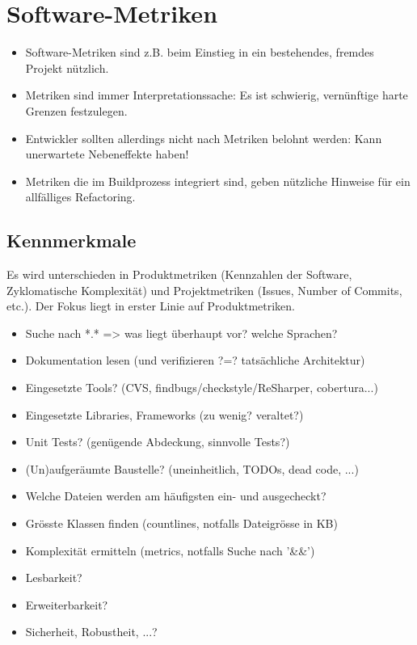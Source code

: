 \section{Software-Metriken}

\begin{itemize}
	\item Software-Metriken sind z.B. beim Einstieg in ein bestehendes, fremdes Projekt nützlich.
	\item Metriken sind immer Interpretationssache: Es ist schwierig, vernünftige harte Grenzen festzulegen.
	\item Entwickler sollten allerdings nicht nach Metriken belohnt werden: Kann unerwartete Nebeneffekte haben!
	\item Metriken die im Buildprozess integriert sind, geben nützliche Hinweise für ein allfälliges Refactoring.
\end{itemize}



\subsection{Kennmerkmale}

Es wird unterschieden in Produktmetriken (Kennzahlen der Software, Zyklomatische Komplexität) und Projektmetriken (Issues, Number of Commits, etc.). Der Fokus liegt in erster Linie auf Produktmetriken.

\begin{itemize}
	\item Suche nach *.* => was liegt überhaupt vor? welche Sprachen?
	\item Dokumentation lesen (und verifizieren ?=? tatsächliche Architektur)
	\item Eingesetzte Tools? (CVS, findbugs/checkstyle/ReSharper, cobertura...)
	\item Eingesetzte Libraries, Frameworks (zu wenig? veraltet?)
	\item Unit Tests? (genügende Abdeckung, sinnvolle Tests?)
	\item (Un)aufgeräumte Baustelle? (uneinheitlich, TODOs, dead code, ...)
	\item Welche Dateien werden am häufigsten ein- und ausgecheckt?
	\item Grösste Klassen finden (countlines, notfalls Dateigrösse in KB)
	\item Komplexität ermitteln (metrics, notfalls Suche nach '\&\&')
	\item Lesbarkeit?
	\item Erweiterbarkeit?
	\item Sicherheit, Robustheit, ...?
\end{itemize}

